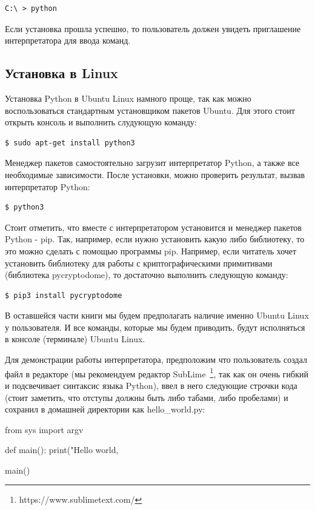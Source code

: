 \begin{verbatim}
C:\ > python
\end{verbatim}

Если установка прошла успешно, то пользователь должен увидеть приглашение 
интерпретатора для ввода команд.

\subsection{Установка в Linux}

Установка Python в Ubuntu Linux намного проще, так как можно воспользоваться
стандартным установщиком пакетов Ubuntu. Для этого стоит открыть консоль
и выполнить слудующую команду:

\begin{verbatim}
$ sudo apt-get install python3
\end{verbatim}

Менеджер пакетов самостоятельно загрузит интерпретатор Python, а также
все необходимые зависимости. После установки, можно проверить результат,
вызвав интерпретатор Python:

\begin{verbatim}
$ python3
\end{verbatim}

Стоит отметить, что вместе с интерпретатором установится и менеджер пакетов Python
- pip. Так, например, если нужно установить какую либо библиотеку, то это можно 
сделать с помощью программы pip. Например, если читатель хочет установить библиотеку
для работы с криптографическими примитивами (библиотека pycryptodome), то достаточно 
выполнить следующую команду:

\begin{verbatim}
$ pip3 install pycryptodome
\end{verbatim} 

В оставшейся части книги мы будем предполагать наличие именно Ubuntu Linux у 
пользователя. И все команды, которые мы будем приводить, будут исполняться в 
консоле (терминале) Ubuntu Linux.

Для демонстрации работы интерпретатора, предположим что пользователь создал
файл в редакторе (мы рекомендуем редактор SubLime~\footnote{https://www.sublimetext.com/}, 
так как он очень гибкий и подсвечивает синтаксис языка Python), ввел в него следующие строчки
кода (стоит заметить, что отступы должны быть либо табами, либо пробелами) и сохранил в 
домашней директории как hello\_world.py:

\begin{python}
from sys import argv

def main():
	print("Hello world, %

main()
\end{python}

